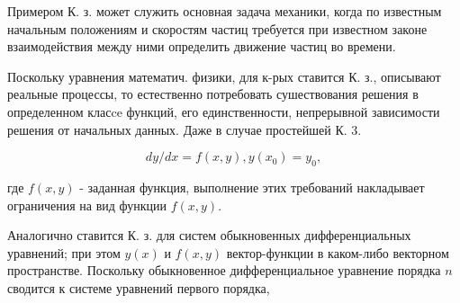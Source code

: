 \documentclass[10pt]{article}
\begin{document}
Примером К. з. может служить основная задача механики, когда по известным начальным положениям и скоростям частиц требуется при известном законе взаимодействия между ними определить движение частиц во времени.



Поскольку уравнения математич. физики, для к-рых ставится К. з., описывают реальные процессы, то естественно потребовать сушествования решения в определенном класce функций, его единственности, непрерывной зависимости решения от начальных данных. Даже в случае простейшей К. 3.



\[

d y / d x=f(x, y), y\left(x_{0}\right)=y_{0},

\]



где $f(x, y)$ - заданная функция, выполнение этих требований накладывает ограничения на вид функции $f(x, y)$.



Аналогично ставится К. з. для систем обыкновенных дифференциальных уравнений; при этом $y(x)$ и $f(x, y)$ вектор-функции в каком-либо векторном пространстве. Поскольку обыкновенное дифференциальное уравнение порядка $n$ сводится к системе уравнений первого порядка,
\end{document}
